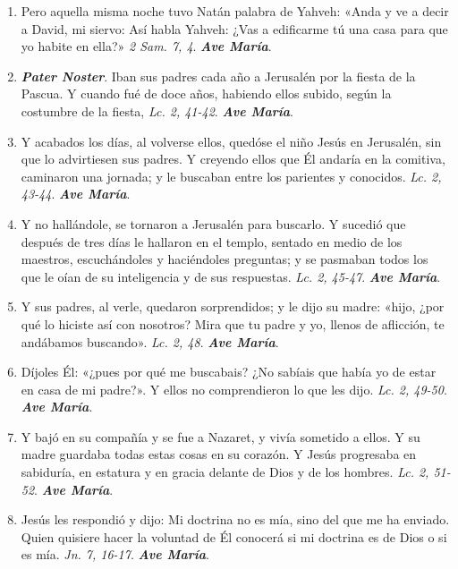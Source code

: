 \documentclass[../../devocionario.tex]{subfiles}
\begin{document}
    \begin{enumerate}
        \item Pero aquella misma noche tuvo Natán palabra de Yahveh: «Anda y ve a decir a David, mi siervo: Así habla Yahveh: ¿Vas a edificarme tú una casa
            para que yo habite en ella?» \emph{2 Sam. 7, 4}. \textbf{\emph{Ave María}}.

        \item \textbf{\emph{Pater Noster}}. Iban sus padres cada año a Jerusalén por la fiesta de la Pascua. 
            Y cuando fué de doce años, habiendo ellos subido, según la costumbre de la fiesta, \emph{Lc. 2, 41-42}. \textbf{\emph{Ave María}}.

        \item Y acabados los días, al volverse ellos, quedóse el niño Jesús en Jerusalén, sin que lo advirtiesen sus padres. 
            Y creyendo ellos que Él andaría en la comitiva, caminaron una jornada; y le buscaban entre los parientes y conocidos. 
            \emph{Lc. 2, 43-44}. \textbf{\emph{Ave María}}.

        \item Y no hallándole, se tornaron a Jerusalén para buscarlo. Y sucedió que después de tres días le hallaron en el templo, 
            sentado en medio de los maestros, escuchándoles y haciéndoles preguntas; y se pasmaban todos los que le oían de su inteligencia 
            y de sus respuestas. \emph{Lc. 2, 45-47}. \textbf{\emph{Ave María}}.

        \item Y sus padres, al verle, quedaron sorprendidos; y le dijo su madre: «hijo, ¿por qué lo hiciste así con nosotros? 
            Mira que tu padre y yo, llenos de aflicción, te andábamos buscando». \emph{Lc. 2, 48}. \textbf{\emph{Ave María}}.

        \item Díjoles Él: «¿pues por qué me buscabais? ¿No sabíais que había yo de estar en casa de mi padre?». Y ellos no comprendieron lo que les dijo. 
            \emph{Lc. 2, 49-50}. \textbf{\emph{Ave María}}.

        \item Y bajó en su compañía y se fue a Nazaret, y vivía sometido a ellos. Y su madre guardaba todas estas cosas en su corazón. 
            Y Jesús progresaba en sabiduría, en estatura y en gracia delante de Dios y de los hombres. \emph{Lc. 2, 51-52}. \textbf{\emph{Ave María}}.

        \item Jesús les respondió y dijo: Mi doctrina no es mía, sino del que me ha enviado. Quien quisiere hacer la voluntad de Él conocerá si mi doctrina
            es de Dios o si es mía. \emph{Jn. 7, 16-17}. \textbf{\emph{Ave María}}.


\end{enumerate}
\end{document}
